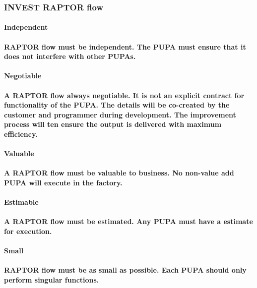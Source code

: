 \subsubsection{INVEST RAPTOR flow}
\paragraph{\textbf{Independent}}
\paragraph{RAPTOR flow must be independent. The PUPA must ensure that it does not interfere with other PUPAs.}
\paragraph{\textbf{Negotiable}}
\paragraph{A RAPTOR flow always negotiable. It is not an explicit contract for functionality of the PUPA. The details will be co-created by the customer and programmer during development. The improvement process will ten ensure the output is delivered with maximum efficiency.}
\paragraph{\textbf{Valuable}}
\paragraph{A RAPTOR flow must be valuable to business. No non-value add PUPA will execute in the factory.}
\paragraph{\textbf{Estimable}}
\paragraph{A RAPTOR flow must be estimated. Any PUPA must have a estimate for execution.}
\paragraph{\textbf{Small}}
\paragraph{RAPTOR flow must be as small as possible. Each PUPA should only perform singular functions.}
